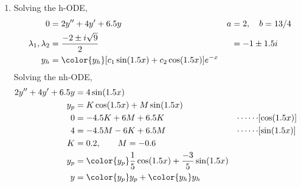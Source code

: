 \begin{enumerate}
    \item Solving the h-ODE,
          \begin{align}
              0                        & = 2y'' + 4y' + 6.5y            &
              a                        & = 2, \quad b = 13/4              \\
              \lambda_{1}, \lambda_{2} & = \frac{-2 \pm i\sqrt{9}}{2}   &
                                       & = -1 \pm 1.5i                    \\
              y_{h}                    & = \color{y_h} [c_{1}\sin(1.5x)
                  + c_{2}\cos(1.5x)]e^{-x}
          \end{align}
          Solving the nh-ODE,
          \begin{align}
              2y'' + 4y' + 6.5y & = 4\sin(1.5x)                                 \\
              y_{p}             & = K \cos(1.5x) + M \sin(1.5x)                 \\
              0                 & = -4.5K + 6M + 6.5K                         &
              \cdots\cdots      & [\cos(1.5x)]                                  \\
              4                 & = -4.5M - 6K + 6.5M                         &
              \cdots\cdots      & [\sin(1.5x)]                                  \\
              K                 & = 0.2, \qquad M = -0.6                        \\
              y_{p}             & = \color{y_p} \frac{1}{5}\cos(1.5x)
              + \frac{-3}{5}\sin(1.5x)                                          \\
              y                 & = {\color{y_p} y_{p}} + {\color{y_h} y_{h}}
          \end{align}


\end{enumerate}
